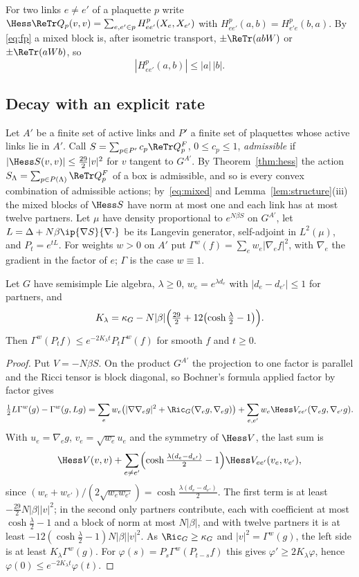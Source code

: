 For two links $e\ne e'$ of a plaquette $p$ write $\Hess\ReTr Q_p(v,v)=
\sum_{e,e'\in p}H^p_{ee'}(X_e,X_{e'})$ with $H^p_{ee'}(a,b)=H^p_{e'e}(b,a)$. By
\eqref{eq:fp} a mixed block is, after isometric transport, $\pm\ReTr(abW)$ or
$\pm\ReTr(aWb)$, so
\begin{equation}\label{eq:mixed}
|H^p_{ee'}(a,b)|\le|a|\,|b| .
\end{equation}

\subsection{Decay with an explicit rate}

Let $A'$ be a finite set of active links and $P'$ a finite set of plaquettes
whose active links lie in $A'$. Call $S=\sum_{p\in P'}c_p\ReTr Q^F_p$, $0\le
c_p\le1$, \emph{admissible} if $|\Hess S(v,v)|\le\frac{29}2|v|^2$ for $v$
tangent to $G^{A'}$. By Theorem~\ref{thm:hess} the action $S_\Lambda=\sum_{p\in
P(\Lambda)}\ReTr Q^F_p$ of a box is admissible, and so is every convex combination
of admissible actions; by~\eqref{eq:mixed} and Lemma~\ref{lem:structure}(iii)
the mixed blocks of $\Hess S$ have norm at most one and each link has at most
twelve partners. Let $\mu$ have density proportional to $e^{N\beta S}$ on
$G^{A'}$, let $L=\Delta+N\beta\ip{\nabla S}{\nabla\cdot}$ be its Langevin generator,
self-adjoint in $L^2(\mu)$, and $P_t=e^{tL}$. For weights $w>0$ on $A'$ put
$\Gamma^w(f)=\sum_ew_e|\nabla_ef|^2$, with $\nabla_e$ the gradient in the factor of
$e$; $\Gamma$ is the case $w\equiv1$.

\begin{lemma}\label{lem:weighted}
Let $G$ have semisimple Lie algebra, $\lambda\ge0$, $w_e=e^{\lambda d_e}$ with
$|d_e-d_{e'}|\le1$ for partners, and
\[
K_\lambda=\kappa_G-N|\beta|\Bigl(\tfrac{29}2+12\bigl(\cosh\tfrac\lambda2-1\bigr)\Bigr).
\]
Then $\Gamma^w(P_tf)\le e^{-2K_\lambda t}P_t\Gamma^w(f)$ for smooth $f$ and $t\ge0$.
\end{lemma}

\begin{proof}
Put $V=-N\beta S$. On the product $G^{A'}$ the projection to one factor is
parallel and the Ricci tensor is block diagonal, so Bochner's formula
applied factor by factor gives
\[
\tfrac12L\Gamma^w(g)-\Gamma^w(g,Lg)=\sum_ew_e\bigl(|\nabla\nabla_eg|^2+\Ric_G(\nabla_e
g,\nabla_eg)\bigr)+\sum_{e,e'}w_e\Hess V_{ee'}(\nabla_eg,\nabla_{e'}g).
\]
With $u_e=\nabla_eg$, $v_e=\sqrt{w_e}u_e$ and the symmetry of $\Hess V$, the last
sum is
\[
\Hess V(v,v)+\sum_{e\ne e'}\Bigl(\cosh\tfrac{\lambda(d_e-d_{e'})}2-1\Bigr)\Hess
V_{ee'}(v_e,v_{e'}),
\]
since $(w_e+w_{e'})/(2\sqrt{w_ew_{e'}})=\cosh\frac{\lambda(d_e-d_{e'})}2$. The first
term is at least $-\frac{29}2N|\beta||v|^2$; in the second only partners
contribute, each with coefficient at most $\cosh\frac\lambda2-1$ and a block of
norm at most $N|\beta|$, and with twelve partners it is at least
$-12(\cosh\frac\lambda2-1)N|\beta||v|^2$. As $\Ric_G\ge\kappa_G$ and $|v|^2=
\Gamma^w(g)$, the left side is at least $K_\lambda\Gamma^w(g)$. For
$\varphi(s)=P_s\Gamma^w(P_{t-s}f)$ this gives $\varphi'\ge2K_\lambda\varphi$, hence
$\varphi(0)\le e^{-2K_\lambda t}\varphi(t)$.
\end{proof}

